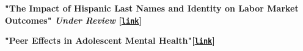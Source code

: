 \documentclass[10pt,letterpaper]{article}
\renewenvironment{itemize}{
  \begin{list}{}{
    \setlength{\leftmargin}{1.5em}
  }
}{
  \end{list}
}
\begin{document}
\begin{itemize}
\bigskip

\item \textbf{"The Impact of Hispanic Last Names and Identity on Labor Market Outcomes" \emph{Under Review} [\href{https://hhadah.github.io/hispanic-last-names/my_paper/Hadah-last-names-draft.pdf}{\tt link}]}

\bigskip

\item \textbf{"Peer Effects in Adolescent Mental Health"[\href{https://hhadah.github.io/Depression_Idea/manuscripts/Hadah-Peer-Effect-Depression.pdf}{\tt link}]}



\end{itemize}
\end{document}
